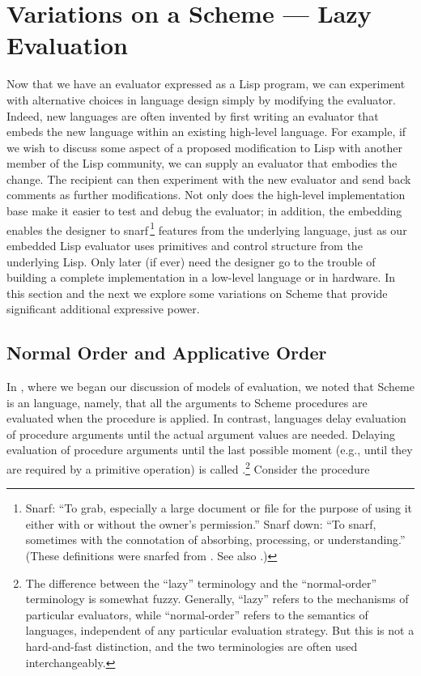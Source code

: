 \section{Variations on a Scheme --- Lazy Evaluation}
\label{Section 4.2}

Now that we have an evaluator expressed as a Lisp program, we can experiment
with alternative choices in language design simply by modifying the evaluator.
Indeed, new languages are often invented by first writing an evaluator that
embeds the new language within an existing high-level language.  For example,
if we wish to discuss some aspect of a proposed modification to Lisp with
another member of the Lisp community, we can supply an evaluator that embodies
the change.  The recipient can then experiment with the new evaluator and send
back comments as further modifications.  Not only does the high-level
implementation base make it easier to test and debug the evaluator; in
addition, the embedding enables the designer to snarf\,\footnote{Snarf: ``To
grab, especially a large document or file for the purpose of using it either
with or without the owner's permission.''  Snarf down: ``To snarf, sometimes
with the connotation of absorbing, processing, or understanding.''  (These
definitions were snarfed from .  See also .)}
features from the underlying language, just as our embedded Lisp evaluator uses
primitives and control structure from the underlying Lisp.  Only later (if
ever) need the designer go to the trouble of building a complete implementation
in a low-level language or in hardware.  In this section and the next we
explore some variations on Scheme that provide significant additional
expressive power.



\subsection{Normal Order and Applicative Order}
\label{Section 4.2.1}

In , where we began our discussion of models of evaluation, we
noted that Scheme is an  language, namely, that all
the arguments to Scheme procedures are evaluated when the procedure is applied.
In contrast,  languages delay evaluation of procedure
arguments until the actual argument values are needed.  Delaying evaluation of
procedure arguments until the last possible moment (e.g., until they are
required by a primitive operation) is called .\footnote{The difference between the ``lazy'' terminology and the
``normal-order'' terminology is somewhat fuzzy.  Generally, ``lazy'' refers to
the mechanisms of particular evaluators, while ``normal-order'' refers to the
semantics of languages, independent of any particular evaluation strategy.  But
this is not a hard-and-fast distinction, and the two terminologies are often
used interchangeably.}  Consider the procedure

